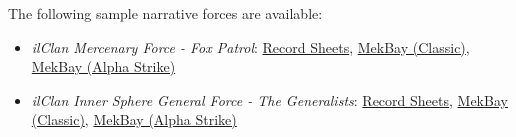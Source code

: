 The following sample narrative forces are available:

\begin{itemize}

\item \emph{ilClan Mercenary Force - Fox Patrol}: \href{https://raw.githubusercontent.com/Eudicods/outworlds-wastes/rules-pdf/fox-patrol.pdf}{Record Sheets}, \href{https://mekbay.com/?units=Outworlds%20Wastes~BMUller_Prime:3:5,BMQuickdraw_QKD5M,BMButcherbird_Prime:4:4,BMMarauder_MAD3R:3:5,BMGriffin_GRF2N:4:4,CVWarriorAttackHelicopter_H8,CVWarriorAttackHelicopter_H8,CVHeavyHoverAPC_LRM,CVHeavyHoverAPC_LRM,CVHeavyTrackedAPC_SRM,CVHeavyTrackedAPC_SRM,BAISStandardBattleArmor_LaserSqd4,BAISStandardBattleArmor_LaserSqd4,BAISStandardBattleArmor_MagneticSqd4,CIFootPlatoonAntiMech_Rifle,CIFootPlatoonAntiMech_Rifle,CIFootPlatoonAntiMech_Rifle,CIFootPlatoonAntiMech_Rifle&name=Fox%20Patrol&gs=cbt}{MekBay (Classic)}, \href{https://mekbay.com/?units=Outworlds%20Wastes~BMUller_Prime:3:5,BMQuickdraw_QKD5M,BMButcherbird_Prime:4:4,BMMarauder_MAD3R:3:5,BMGriffin_GRF2N:4:4,CVWarriorAttackHelicopter_H8,CVWarriorAttackHelicopter_H8,CVHeavyHoverAPC_LRM,CVHeavyHoverAPC_LRM,CVHeavyTrackedAPC_SRM,CVHeavyTrackedAPC_SRM,BAISStandardBattleArmor_LaserSqd4,BAISStandardBattleArmor_LaserSqd4,BAISStandardBattleArmor_MagneticSqd4,CIFootPlatoonAntiMech_Rifle,CIFootPlatoonAntiMech_Rifle,CIFootPlatoonAntiMech_Rifle,CIFootPlatoonAntiMech_Rifle&name=Fox%20Patrol&gs=as}{MekBay (Alpha Strike)}

\item \emph{ilClan Inner Sphere General Force - The Generalists}: \href{https://raw.githubusercontent.com/Eudicods/outworlds-wastes/rules-pdf/generalists.pdf}{Record Sheets}, \href{https://mekbay.com/?units=Outworlds%20Wastes~BMQuickdraw_QKD5Mr,BMGriffin_GRF3N,BMWolverine_WVR9R,BMChameleon_CLN8V,CVMaximHeavyHoverTransport_BAFactoryUpgrade,CVMaximHeavyHoverTransport_BAFactoryUpgrade,CVGalleonLightTank_GAL102,CVGalleonLightTank_GAL102,BAISStandardBattleArmor_MagneticSqd4,BAISStandardBattleArmor_MagneticSqd4,BAISStandardBattleArmor_MagneticSqd4,BAISStandardBattleArmor_MagneticSqd4&name=The%20Generalists&gs=cbt}{MekBay (Classic)}, \href{https://mekbay.com/?units=Outworlds%20Wastes~BMQuickdraw_QKD5Mr,BMGriffin_GRF3N,BMWolverine_WVR9R,BMChameleon_CLN8V,CVMaximHeavyHoverTransport_BAFactoryUpgrade,CVMaximHeavyHoverTransport_BAFactoryUpgrade,CVGalleonLightTank_GAL102,CVGalleonLightTank_GAL102,BAISStandardBattleArmor_MagneticSqd4,BAISStandardBattleArmor_MagneticSqd4,BAISStandardBattleArmor_MagneticSqd4,BAISStandardBattleArmor_MagneticSqd4&name=The%20Generalists&gs=as}{MekBay (Alpha Strike)}


\end{itemize}
